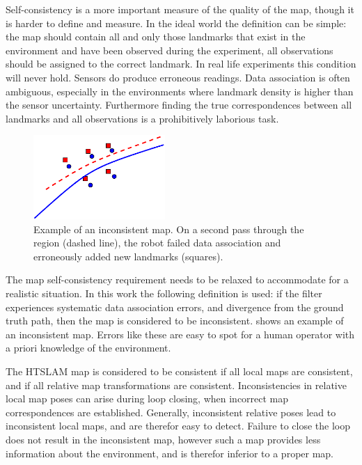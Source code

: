 Self-consistency is a more important measure of the quality of the
map, though it is harder to define and measure. In the ideal world the
definition can be simple: the map should contain all and only those
landmarks that exist in the environment and have been observed during
the experiment, all observations should be assigned to the correct
landmark. In real life experiments this condition will never hold.
Sensors do produce erroneous readings. Data association is often
ambiguous, especially in the environments where landmark density is
higher than the sensor uncertainty. Furthermore finding the true
correspondences between all landmarks and all observations is a
prohibitively laborious task.

\begin{figure}[htbp]
  \centering
  \includegraphics[width=5cm]{Pics/fig_inconsistent_map}
  \caption{Example of an inconsistent map. On a second pass through
    the region (dashed line), the robot failed data association and
    erroneously added new landmarks (squares).}
  \label{fig:inconsistent_map}
\end{figure}


The map self-consistency requirement needs to be relaxed to accommodate
for a realistic situation. In this work the following definition is
used: if the filter experiences systematic data association errors,
and divergence from the ground truth path, then the map is considered
to be inconsistent.  shows an example
of an inconsistent map. Errors like these are easy to spot for a human
operator with a priori knowledge of the environment.

The HTSLAM map is considered to be consistent if all local maps are
consistent, and if all relative map transformations are consistent.
Inconsistencies in relative local map poses can arise during loop
closing, when incorrect map correspondences are established.
Generally, inconsistent relative poses lead to inconsistent local
maps, and are therefor easy to detect. Failure to close the loop does
not result in the inconsistent map, however such a map provides less
information about the environment, and is therefor inferior to a
proper map.

